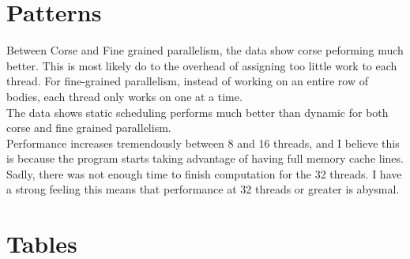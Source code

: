 \documentclass[12pt]{article}
\begin{document}
\section*{Patterns}

Between Corse and Fine grained parallelism, the data show corse
peforming much better. This is most likely do to the overhead of
assigning too little work to each thread. For fine-grained parallelism,
instead of working on an entire row of bodies, each thread only works on
one at a time.\\

The data shows static scheduling performs much better than dynamic for
both corse and fine grained parallelism.\\

Performance increases tremendously between 8 and 16 threads, and I
believe this is because the program starts taking advantage of having
full memory cache lines.\\

Sadly, there was not enough time to finish computation for the 32
threads. I have a strong feeling this means that performance at 32
threads or greater is abysmal.

\section*{Tables}

\begin{figure}[h]
\end{figure}

\begin{figure}[h]
\end{figure}
\begin{figure}[h]
\end{figure}

\begin{figure}[h]
\end{figure}
\end{document}
